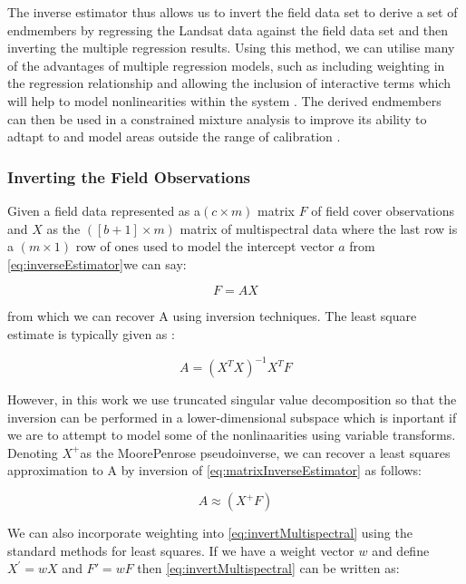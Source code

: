 \documentclass[remotesensing,article,accept,moreauthors,pdftex,12pt,a4paper]{mdpi}
\begin{document}
The inverse estimator thus allows us to invert the field data set to derive a set of endmembers by regressing the Landsat data against the field data set and then inverting the multiple regression results. Using this method, we can utilise many of the advantages of multiple regression models, such as including weighting in the regression relationship and allowing the inclusion of interactive terms which will help to model nonlinearities within the system \citep{Puyou-Lascassies1994b}. The derived endmembers can then be used in a constrained mixture analysis to improve its ability to adtapt to and model areas outside the range of calibration \citep{Phinn2002a}. 

\subsubsection{Inverting the Field Observations}

Given a field data represented as a$(c\times m)$ matrix $F$ of field cover observations and $X$ as the $([b+1]\times m)$ matrix of multispectral data where the last row is a $(m\times1)$ row of ones used to model the intercept vector $a$ from \ref{eq:inverseEstimator}we can say:

\begin{equation} F=AX\label{eq:matrixInverseEstimator}\end{equation} 

from which we can recover A using inversion techniques. The least square estimate is typically given as \citep{Lawson1995}:

\begin{equation} A=(X^{T}X)^{-1}X^{T}F\label{eq:leastSquaresSolution}\end{equation} 

However, in this work we use truncated singular value decomposition \citep{Xu1998} so that the inversion can be performed in a lower-dimensional subspace which is inportant if we are to attempt to model some of the nonlinaarities using variable transforms. Denoting $X^{+}$as the Moore\textendash{}Penrose pseudoinverse, we can recover a least squares approximation to A by inversion of \ref{eq:matrixInverseEstimator} as follows:

\begin{equation} A\approx(X^{+}F)\label{eq:invertMultispectral}\end{equation} 

We can also incorporate weighting into \ref{eq:invertMultispectral} using the standard methods for least squares. If we have a weight vector $w$ and define $X^{'}=wX$ and $F'=wF$ then \ref{eq:invertMultispectral} can be written as:
\end{document}
